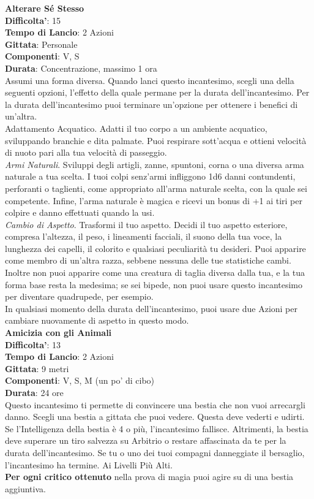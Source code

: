 \begin{multicols}{2}
\medskip\textbf{Alterare Sé Stesso}\\
\textbf{Difficolta'}: 15\\
\textbf{Tempo di Lancio}: 2 Azioni\\
\textbf{Gittata}: Personale\\
\textbf{Componenti}: V, S\\
\textbf{Durata}: Concentrazione, massimo 1 ora\\
Assumi una forma diversa. Quando lanci questo incantesimo, scegli una della seguenti opzioni, l’effetto della quale permane per la durata dell’incantesimo. Per  la durata dell’incantesimo puoi terminare un’opzione per ottenere i benefici di un’altra.\\
Adattamento Acquatico. Adatti il tuo corpo a un ambiente acquatico, sviluppando branchie e dita palmate. Puoi respirare sott’acqua e ottieni velocità di nuoto pari alla tua velocità di passeggio.\\
\textit{Armi Naturali}. Sviluppi degli artigli, zanne, spuntoni, corna o una diversa arma naturale a tua scelta. I tuoi colpi senz’armi infliggono 1d6 danni contundenti, perforanti o taglienti, come appropriato all’arma naturale scelta, con la quale sei competente. Infine, l’arma naturale è magica e ricevi un bonus di +1 ai tiri per colpire e danno effettuati quando la usi.\\
\textit{Cambio di Aspetto}. Trasformi il tuo aspetto. Decidi il tuo aspetto esteriore, compresa l’altezza, il peso, i lineamenti facciali, il suono della tua voce, la lunghezza dei capelli, il colorito e qualsiasi peculiarità tu desideri. Puoi apparire come membro di un’altra razza, sebbene nessuna delle tue statistiche cambi. Inoltre non puoi apparire come una creatura di taglia diversa dalla tua, e la tua forma base resta la medesima; se sei bipede, non puoi usare questo incantesimo per diventare quadrupede, per esempio.\\
In qualsiasi momento della durata dell’incantesimo, puoi usare due Azioni per cambiare nuovamente di aspetto in questo modo.\\

\medskip\textbf{Amicizia con gli Animali}\\
\textbf{Difficolta'}: 13\\
\textbf{Tempo di Lancio}: 2 Azioni\\
\textbf{Gittata}: 9 metri\\
\textbf{Componenti}: V, S, M (un po’ di cibo)\\
\textbf{Durata}: 24 ore\\
Questo incantesimo ti permette di convincere una bestia che non vuoi arrecargli danno. Scegli una bestia a gittata che puoi vedere. Questa deve vederti e udirti. Se l’Intelligenza della bestia è 4 o più, l’incantesimo fallisce. Altrimenti, la bestia deve superare un tiro salvezza su Arbitrio o restare affascinata da te per la durata dell’incantesimo. Se tu o uno dei tuoi compagni danneggiate il bersaglio, l’incantesimo ha termine. Ai Livelli Più Alti.\\
\textbf{Per ogni critico ottenuto} nella prova di magia puoi agire su di una bestia aggiuntiva. 


\end{multicols}
